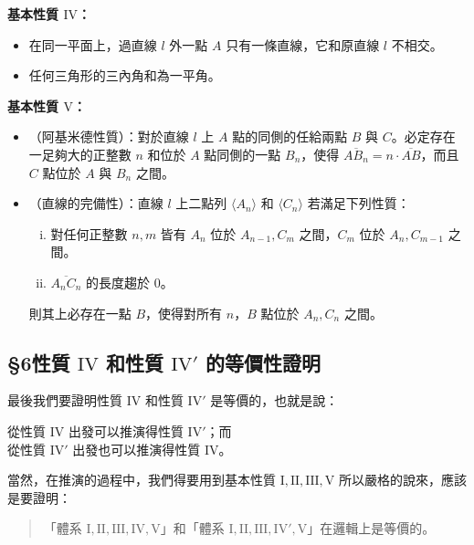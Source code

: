 \noindent\textbf{基本性質 $\mathrm{IV}$：}
\begin{itemize}[leftmargin=2.8em, itemsep=0.2em]
  \item[$\mathrm{IV}$：]在同一平面上，過直線 $l$ 外一點 $A$ 只有一條直線，它和原直線 $l$ 不相交。
  \item[$\mathrm{IV}'$：]任何三角形的三內角和為一平角。
\end{itemize}

\noindent\textbf{基本性質 $\mathrm{V}$：}
\begin{itemize}[leftmargin=2.8em, itemsep=0.2em]
  \item[$\mathrm{V}_a$：]（阿基米德性質）：對於直線 $l$ 上 $A$ 點的同側的任給兩點 $B$ 與 $C$。必定存在一足夠大的正整數 $n$ 和位於 $A$ 點同側的一點 $B_n$，使得 $\overline{AB_n} = n \cdot \overline{AB}$，而且 $C$ 點位於 $A$ 與 $B_n$ 之間。
  \item[$\mathrm{V}_b$：]（直線的完備性）：直線 $l$ 上二點列 $\langle A_n \rangle$ 和 $\langle C_n \rangle$ 若滿足下列性質：
  \begin{enumerate}[(i)]
    \item 對任何正整數 $n, m$ 皆有 $A_n$ 位於 $A_{n-1}, C_m$ 之間，$C_m$ 位於 $A_n, C_{m-1}$ 之間。
    \item $\overline{A_nC_n}$ 的長度趨於 0。
  \end{enumerate}
  則其上必存在一點 $B$，使得對所有 $n$，$B$ 點位於 $A_n, C_n$ 之間。
\end{itemize}

\subsection*{\S 6\quad 性質 $\mathrm{IV}$ 和性質 $\mathrm{IV}'$ 的等價性證明}
\label{sec:b3_a1_6}

最後我們要證明性質 $\mathrm{IV}$ 和性質 $\mathrm{IV}'$ 是等價的，也就是說：
\begin{center}
  從性質 $\mathrm{IV}$ 出發可以推演得性質 $\mathrm{IV}'$；而\\
  從性質 $\mathrm{IV}'$ 出發也可以推演得性質 $\mathrm{IV}$。
\end{center}
當然，在推演的過程中，我們得要用到基本性質 $\mathrm{I}, \mathrm{II}, \mathrm{III}, \mathrm{V}$ 所以嚴格的說來，應該是要證明：
\begin{quote}
  「體系 $\mathrm{I}, \mathrm{II}, \mathrm{III}, \mathrm{IV}, \mathrm{V}$」和「體系 $\mathrm{I}, \mathrm{II}, \mathrm{III}, \mathrm{IV}', \mathrm{V}$」在邏輯上是等價的。
\end{quote}

